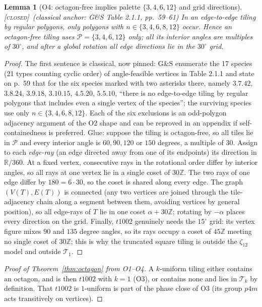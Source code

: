 \documentclass[11pt]{article}
\newtheorem{lemma}[theorem]{Lemma}
\theoremstyle{definition}
\newcommand{\CLOSED}{\textnormal{\textsc{[closed]}}}
\newcommand{\T}{\mathcal{T}}
\newcommand{\R}{\mathbb{R}}
\newcommand{\Z}{\mathbb{Z}}
\begin{document}
\begin{lemma}[O4: octagon-free implies palette $\{3,4,6,12\}$ and grid directions]
\label{lem:O4} \CLOSED\ (classical anchor: G\&S Table 2.1.1, pp.~59--61)\;
In an edge-to-edge tiling by regular polygons, only polygons with
$n \in \{3,4,6,8,12\}$ occur. Hence an octagon-free tiling uses
$\mathcal{P} = \{3,4,6,12\}$ only; all its interior angles are multiples of $30^\circ$,
and after a global rotation all edge directions lie in the $30^\circ$ grid.
\end{lemma}

\begin{proof}
The first sentence is classical, now pinned: G\&S enumerate the 17 species (21 types
counting cyclic order) of angle-feasible vertices in Table 2.1.1 and state on p.~59 that
for the six species marked with two asterisks there, namely $3.7.42$, $3.8.24$,
$3.9.18$, $3.10.15$, $4.5.20$, $5.5.10$, ``there is no edge-to-edge tiling by regular
polygons that includes even a single vertex of the species''; the surviving species use
only $n \in \{3,4,6,8,12\}$. Each of the six exclusions is an odd-polygon adjacency
argument of the O2 shape and can be reproved in an appendix if self-containedness is
preferred. Glue:
suppose the tiling is octagon-free, so all tiles lie in $\mathcal{P}$ and every interior
angle is $60, 90, 120$ or $150$ degrees, a multiple of $30$. Assign to each
\emph{edge-ray} (an edge directed away from one of its endpoints) its direction in
$\R/360$. At a fixed vertex, consecutive rays in the rotational order differ by interior
angles, so all rays at one vertex lie in a single coset of $30\Z$. The two rays of one
edge differ by $180 = 6 \cdot 30$, so the coset is shared along every edge. The graph
$(V(T), E(T))$ is connected (any two vertices are joined through the tile-adjacency chain
along a segment between them, avoiding vertices by general position), so all edge-rays of
$T$ lie in one coset $\alpha + 30\Z$; rotating by $-\alpha$ places every direction on the
grid. Finally, $t1002$ genuinely needs the $15^\circ$ grid: its vertex figure mixes $90$
and $135$ degree angles, so its rays occupy a coset of $45\Z$ meeting no single coset of
$30\Z$; this is why the truncated square tiling is outside the $\zeta_{12}$ model and
outside $\T_1$.
\end{proof}

\begin{proof}[Proof of Theorem~\ref{thm:octagon} from O1--O4]
A $k$-uniform tiling either contains an octagon, and is then $t1002$ with $k = 1$ (O3),
or contains none and lies in $\T_k$ by definition. That $t1002$ is $1$-uniform is part of
the phase close of O3 (its group $p4m$ acts transitively on vertices).
\end{proof}
\end{document}
